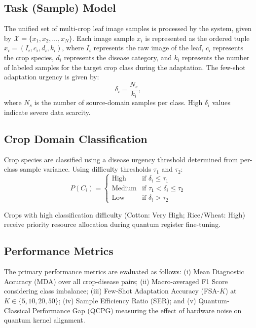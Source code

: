 \documentclass[conference]{IEEEtran}
\begin{document}
\subsection{Task (Sample) Model}

The unified set of multi-crop leaf image samples is processed by the system, given by $\mathcal{X} = \{x_1, x_2, \ldots, x_N\}$. Each image sample $x_i$ is represented as the ordered tuple $x_i = (I_i, c_i, d_i, k_i)$, where $I_i$ represents the raw image of the leaf, $c_i$ represents the crop species, $d_i$ represents the disease category, and $k_i$ represents the number of labeled samples for the target crop class during the adaptation. The few-shot adaptation urgency is given by:
\begin{equation}
  \delta_i = \frac{N_s}{k_i},
\end{equation}
where $N_s$ is the number of source-domain samples per class. High $\delta_i$ values indicate severe data scarcity.

\subsection{Crop Domain Classification}

Crop species are classified using a disease urgency threshold determined from per-class sample variance. Using difficulty thresholds $\tau_1$ and $\tau_2$:
\begin{equation}
  P(C_i) = \begin{cases}
    \text{High}   & \text{if } \delta_i \leq \tau_1 \\
    \text{Medium} & \text{if } \tau_1 < \delta_i \leq \tau_2 \\
    \text{Low}    & \text{if } \delta_i > \tau_2
  \end{cases}
\end{equation}

Crops with high classification difficulty (Cotton: Very High; Rice/Wheat: High) receive priority resource allocation during quantum register fine-tuning.

\subsection{Performance Metrics}

The primary performance metrics are evaluated as follows: (i) Mean Diagnostic Accuracy (MDA) over all crop-disease pairs; (ii) Macro-averaged F1 Score considering class imbalance; (iii) Few-Shot Adaptation Accuracy (FSA-$K$) at $K \in \{5, 10, 20, 50\}$; (iv) Sample Efficiency Ratio (SER); and (v) Quantum-Classical Performance Gap (QCPG) measuring the effect of hardware noise on quantum kernel alignment.
\end{document}
